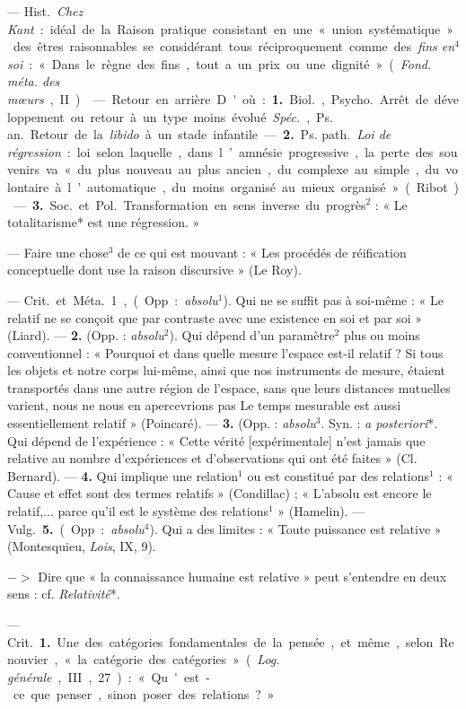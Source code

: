 \begin{itemize}[leftmargin=1cm, label=, itemsep=1pt]
 — \si{Hist.} {\it Chez Kant} : idéal de la Raison
pratique consistant en une « union systématique » des êtres raisonnables se
considérant tous réciproquement comme des {\it fins en$^4$ soi} : « Dans le
règne des fins, tout a un prix ou une dignité » ({\it Fond. méta. des mœurs},
II).

 — Retour en arrière. D'où : {\bf 1.} \si{Biol.}, \si{Psycho.}
Arrêt de développement ou retour à un type moins évolué. {\it Spéc.},
\si{Ps. an.} Retour de la {\it libido} à un stade infantile. — {\bf 2.}
\si{Ps. path.} {\it Loi de régression} : loi selon laquelle, dans l’amnésie
progressive, la perte des souvenirs va « du plus nouveau au plus ancien, du
complexe au simple, du volontaire à l’automatique, du moins organisé au mieux
organisé » (Ribot). — {\bf 3.} \si{Soc.} et \si{Pol.} Transformation en sens
inverse du progrès$^2$ : « Le totalitarisme* est une régression. »

 — Faire une chose$^3$ de ce qui est mouvant : « Les procédés de
réification conceptuelle dont use la raison discursive » (Le Roy).

 — \si{Crit.} et \si{Méta.} 1, (Opp. : {\it absolu}$^1$). Qui ne
se suffit pas à soi-même : « Le relatif ne se conçoit que par contraste avec
une existence en soi et par soi » (Liard). — {\bf 2.} (Opp. :
{\it absolu}$^2$). Qui dépend d'un paramètre$^2$ plus ou moins
conventionnel : « Pourquoi et dans quelle mesure l’espace est-il relatif ? Si
tous les objets et notre corps lui-même, ainsi que nos instruments de mesure,
étaient transportés dans une autre région de l'espace, sans que leurs
distances mutuelles varient, nous ne nous en apercevrions pas Le temps
mesurable est aussi essentiellement relatif » (Poincaré). — {\bf 3.} (Opp. :
{\it absolu}$^3$. Syn. : {\it a posteriori}*. Qui dépend de l'expérience : «
Cette vérité [expérimentale] n’est jamais que relative au nombre
d’expériences et d'observations qui ont été faites » (Cl. Bernard). —
{\bf 4.} Qui implique une relation$^1$ ou est constitué par des
relations$^1$ : « Cause et effet sont des termes relatifs » (Condillac) ; «
L’absolu est encore le relatif,... parce qu'il est le système des
relations$^1$ » (Hamelin). — \si{Vulg.} {\bf 5.} (Opp. : {\it absolu}$^4$).
Qui a des limites : « Toute puissance est relative » (Montesquieu, {\it
Lois}, IX, 9).

$->$ Dire que « la connaissance
humaine est relative » peut s’entendre en deux sens : cf. {\it Relativité}*.

 — \si{Crit.} {\bf 1.} Une des catégories fondamentales de la
pensée, et même, selon Renouvier, « la catégorie des catégories » ({\it Log.
générale}, III, 27) : « Qu'est-ce que penser, sinon poser des relations ? »


\end{itemize}
